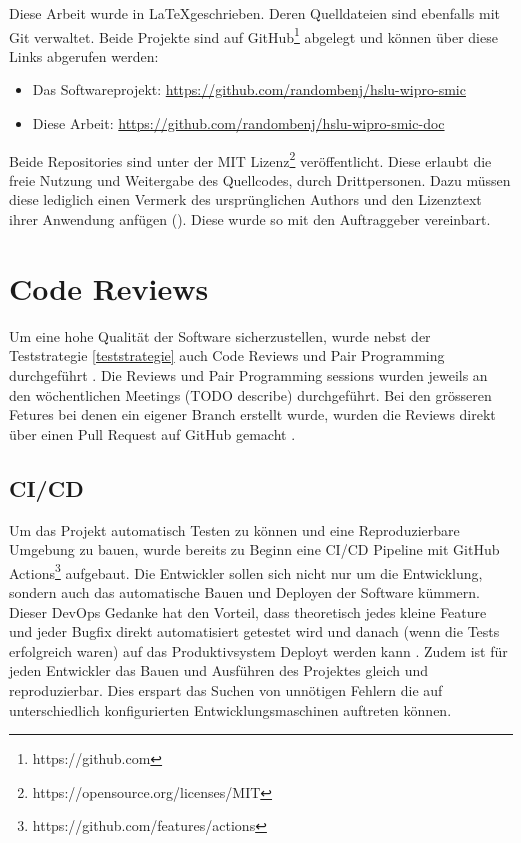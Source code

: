 Diese Arbeit wurde in \LaTeX geschrieben. Deren Quelldateien sind ebenfalls mit Git verwaltet.
Beide Projekte sind auf GitHub\footnote{https://github.com} abgelegt und können über diese Links abgerufen werden:

\begin{itemize}
    \item Das Softwareprojekt: \url{https://github.com/randombenj/hslu-wipro-smic}
    \item Diese Arbeit: \url{https://github.com/randombenj/hslu-wipro-smic-doc}
\end{itemize}

Beide Repositories sind unter der MIT Lizenz\footnote{https://opensource.org/licenses/MIT} veröffentlicht.
Diese erlaubt die freie Nutzung und Weitergabe des Quellcodes, durch Drittpersonen.
Dazu müssen diese lediglich einen Vermerk des ursprünglichen Authors und den Lizenztext ihrer Anwendung anfügen (\parencite{mit_licence}).
Diese wurde so mit den Auftraggeber vereinbart.

\section{Code Reviews}

Um eine hohe Qualität der Software sicherzustellen, wurde nebst der Teststrategie \ref{teststrategie}
auch Code Reviews und Pair Programming durchgeführt \parencite{fu2017code}.
Die Reviews und Pair Programming sessions wurden jeweils an den wöchentlichen
Meetings (TODO describe) durchgeführt.
Bei den grösseren Fetures bei denen ein eigener Branch erstellt wurde, wurden die
Reviews direkt über einen Pull Request auf GitHub gemacht \parencite{github_flow_docs_2021}.

\subsection{\ac{CI/CD}}

Um das Projekt automatisch Testen zu können und eine Reproduzierbare Umgebung zu bauen,
wurde bereits zu Beginn eine \ac{CI/CD} Pipeline mit GitHub Actions\footnote{https://github.com/features/actions}
aufgebaut.
Die Entwickler sollen sich nicht nur um die Entwicklung, sondern auch das automatische Bauen und Deployen der
Software kümmern. Dieser DevOps Gedanke hat den Vorteil, dass
theoretisch jedes kleine Feature und jeder Bugfix direkt automatisiert getestet
wird und danach (wenn die Tests erfolgreich waren) auf das Produktivsystem
Deployt werden kann \parencite{what_is_devops}.
Zudem ist für jeden Entwickler das Bauen und Ausführen des Projektes gleich und
reproduzierbar. Dies erspart das Suchen von unnötigen Fehlern die auf unterschiedlich
konfigurierten Entwicklungsmaschinen auftreten können.
